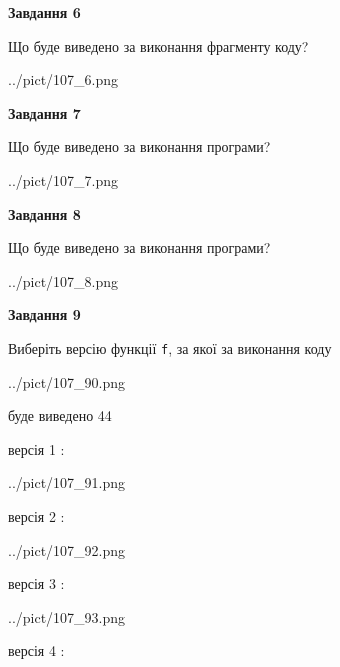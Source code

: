 \documentclass[12pt, ukrainian]{article}
\def\code#1{\Verb!#1!}
\begin{document}
{\begin {large}
{\begin {center}\textbf{Завдання 6}\end {center}}

Що буде виведено за виконання фрагменту коду?\par
\begin{center}
	{../pict/107_6.png}
\end{center}
\newpage

{\begin {center}\textbf{Завдання 7}\end {center}}

Що буде виведено за виконання програми?\par
\begin{center}
	{../pict/107_7.png}
\end{center}
\newpage

{\begin {center}\textbf{Завдання 8}\end {center}}

Що буде виведено за виконання програми?\par
\begin{center}
	{../pict/107_8.png}
\end{center}
\newpage

{\begin {center}\textbf{Завдання 9}\end {center}}

Виберіть версію функції \code{f}, за якої за виконання коду
\begin{center}
	{../pict/107_90.png}
\end{center}
буде виведено 44

\vspace{5mm}
версія 1 :

\begin{center}
	{../pict/107_91.png}
\end{center}
версія 2 :

\begin{center}
	{../pict/107_92.png}
\end{center}
версія 3 :

\begin{center}
	{../pict/107_93.png}
\end{center}
версія 4 :


\end{large}}
\end{document}
